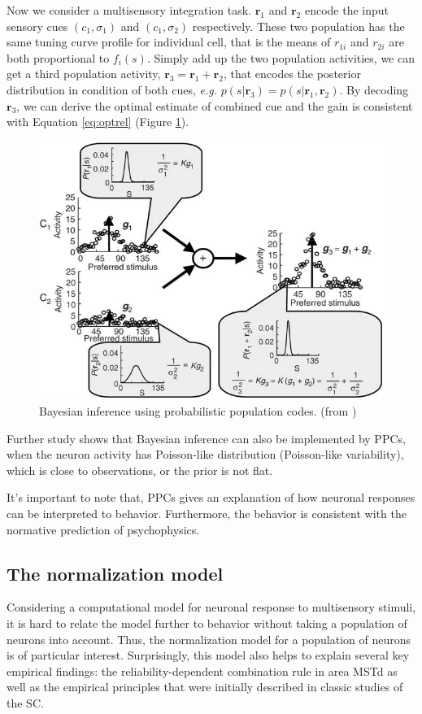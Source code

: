 \documentclass{article}[11pt]
\newcommand{\eg}{\textit{e.g. }}
\begin{document}
Now we consider a multisensory integration task. $\mathbf{r}_1$ and $\mathbf{r}_2$ encode the input sensory cues $(c_1, \sigma_1)$ and $(c_1, \sigma_2)$ respectively. These two population has the same tuning curve profile for individual cell, that is the means of $r_{1i}$ and $r_{2i}$ are both proportional to $f_i(s)$. Simply add up the two population activities, we can get a third population activity, $\mathbf{r}_3 = \mathbf{r}_1 + \mathbf{r}_2$, that encodes the posterior distribution in condition of both cues, \eg $p(s|\mathbf{r}_3) = p(s|\mathbf{r}_1,\mathbf{r}_2)$. By decoding $\mathbf{r}_3$, we can derive the optimal estimate of combined cue and the gain is consistent with Equation \ref{eq:optrel} (Figure \ref{fig:infer}).

\begin{figure}[tpb]
  \centering
  \includegraphics[width=.8\textwidth]{infer}
  \caption{Bayesian inference using probabilistic population codes. (from \cite{ma_bayesian_2006})}
  \label{fig:infer}
\end{figure}

Further study shows that Bayesian inference can also be implemented by PPCs, when the neuron activity has Poisson-like distribution (Poisson-like variability), which is close to observations, or the prior is not flat.

It's important to note that, PPCs gives an explanation of how neuronal responses can be interpreted to behavior. Furthermore, the behavior is consistent with the normative prediction of psychophysics.

\subsection{The normalization model}
Considering a computational model for neuronal response to multisensory stimuli, it is hard to relate the model further to behavior without taking a population of neurons into account. Thus, the normalization model \cite{ohshiro_normalization_2011} for a population of neurons is of particular interest. Surprisingly, this model also helps to explain several key empirical findings: the reliability-dependent combination rule in area MSTd as well as the empirical principles that were initially described in classic studies of the SC.
\end{document}
